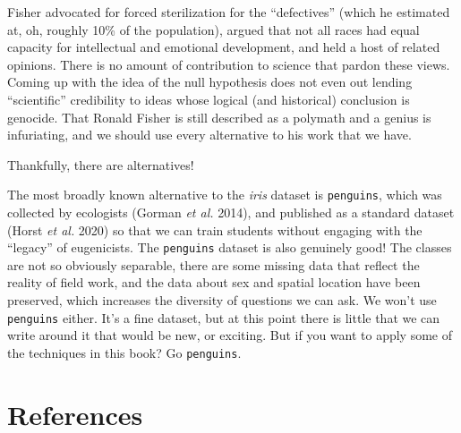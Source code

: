 \documentclass[
  letterpaper,
]{scrbook}
\begin{document}
Fisher advocated for forced sterilization for the ``defectives'' (which
he estimated at, oh, roughly 10\% of the population), argued that not
all races had equal capacity for intellectual and emotional development,
and held a host of related opinions. There is no amount of contribution
to science that pardon these views. Coming up with the idea of the null
hypothesis does not even out lending ``scientific'' credibility to ideas
whose logical (and historical) conclusion is genocide. That Ronald
Fisher is still described as a polymath and a genius is infuriating, and
we should use every alternative to his work that we have.

Thankfully, there are alternatives!

The most broadly known alternative to the \emph{iris} dataset is
\texttt{penguins}, which was collected by ecologists (Gorman \emph{et
al.} 2014), and published as a standard dataset (Horst \emph{et al.}
2020) so that we can train students without engaging with the ``legacy''
of eugenicists. The \texttt{penguins} dataset is also genuinely good!
The classes are not so obviously separable, there are some missing data
that reflect the reality of field work, and the data about sex and
spatial location have been preserved, which increases the diversity of
questions we can ask. We won't use \texttt{penguins} either. It's a fine
dataset, but at this point there is little that we can write around it
that would be new, or exciting. But if you want to apply some of the
techniques in this book? Go \texttt{penguins}.

\section*{References}\label{bibliography-1}

\end{document}

